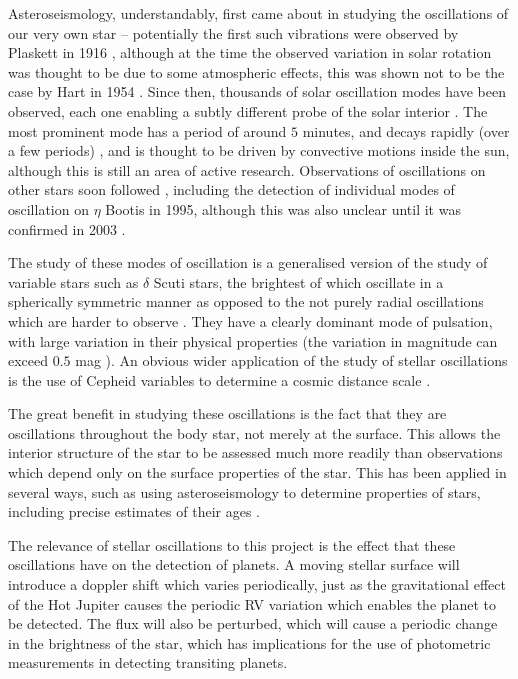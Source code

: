\documentclass[11pt]{amsart}
\begin{document}
Asteroseismology, understandably, first came about in studying the oscillations of our very own star -- potentially the first such vibrations were observed by Plaskett in 1916 \cite{Plaskett1916}, although at the time the observed variation in solar rotation was thought to be due to some atmospheric effects, this was shown not to be the case by Hart in 1954 \cite{Hart1954}.  Since then, thousands of solar oscillation modes have been observed, each one enabling a subtly different probe of the solar interior \cite{DiMauro2017}.  The most prominent mode has a period of around $5$ minutes, and decays rapidly (over a few periods) \cite{Ulrich1970},  and is thought to be driven by convective motions inside the sun, although this is still an area of active research.  Observations of oscillations on other stars soon followed \cite{Brown1991}, including the detection of individual modes of oscillation on $\eta$ Bootis in 1995, although this was also unclear until it was confirmed in 2003 \cite{Kjeldsen2003}.

The study of these modes of oscillation is a generalised version of the study of variable stars such as $\delta$ Scuti stars, the brightest of which oscillate in a spherically symmetric manner as opposed to the not purely radial oscillations which are harder to observe \cite{Garg2010}.  They have a clearly dominant mode of pulsation, with large variation in their physical properties (the variation in magnitude can exceed $0.5$ mag \cite{Garg2010}).  An obvious wider application of the study of stellar oscillations is the use of Cepheid variables to determine a cosmic distance scale \cite{Madore1991}.

The great benefit in studying these oscillations is the fact that they are oscillations throughout the body star, not merely at the surface.  This allows the interior structure of the star to be assessed much more readily than observations which depend only on the surface properties of the star.  This has been applied in several ways, such as using asteroseismology to determine properties of stars, including precise estimates of their ages \cite{Chaplin2013} \cite{Cunha2007}.

The relevance of stellar oscillations to this project is the effect that these oscillations have on the detection of planets.  A moving stellar surface will introduce a doppler shift which varies periodically, just as the gravitational effect of the Hot Jupiter causes the periodic RV variation which enables the planet to be detected.  The flux will also be perturbed, which will cause a periodic change in the brightness of the star, which has implications for the use of photometric measurements in detecting transiting planets.
\end{document}
